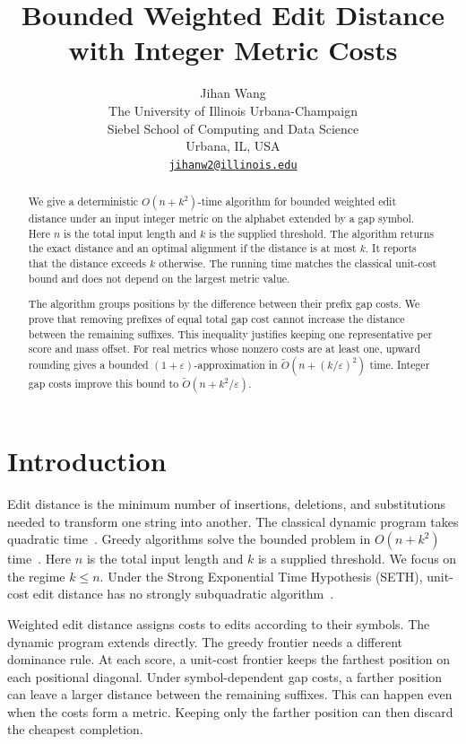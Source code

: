 \documentclass[11pt]{article}
\title{Bounded Weighted Edit Distance with Integer Metric Costs}
\author{Jihan Wang\\[0.3em]
    \small The University of Illinois Urbana-Champaign\\
    \small Siebel School of Computing and Data Science\\
    \small Urbana, IL, USA\\
    \small \href{mailto:jihanw2@illinois.edu}{\nolinkurl{jihanw2@illinois.edu}}}
\date{}
\theoremstyle{remark}
\newcommand{\eps}{\varepsilon}
\newcommand{\softO}{\widetilde O}
\begin{document}
\maketitle

\begin{abstract}
\normalsize
We give a deterministic $O(n+k^2)$-time algorithm for bounded weighted
edit distance under an input integer metric on the alphabet extended
by a gap symbol. Here $n$ is the total input length and
$k$ is the supplied threshold. The algorithm returns the exact
distance and an optimal alignment if the distance is at most $k$. It reports that the
distance exceeds $k$ otherwise. The running time matches the classical
unit-cost bound and does not depend on the largest metric value.

The algorithm groups positions by the difference between their prefix
gap costs. We prove that removing prefixes of equal total gap cost
cannot increase the distance between the remaining suffixes. This
inequality justifies keeping one representative per score and mass
offset. For real metrics whose nonzero costs are at least one, upward
rounding gives a bounded $(1+\eps)$-approximation in
$\softO(n+(k/\eps)^2)$ time. Integer gap costs
improve this bound to $\softO(n+k^2/\eps)$.
\end{abstract}

\section{Introduction}\label{sec:introduction}

Edit distance is the minimum number of insertions, deletions, and
substitutions needed to transform one string into another. The classical
dynamic program takes quadratic time~\cite{WF74}. Greedy algorithms solve
the bounded problem in $O(n+k^2)$ time~\cite{Ukk85,Mye86,LV88}.
Here $n$ is the total input length and $k$ is a supplied threshold.
We focus on the regime $k\le n$.
Under the Strong Exponential Time Hypothesis (SETH), unit-cost edit
distance has no strongly subquadratic algorithm~\cite{BI18,BK15}.

Weighted edit distance assigns costs to edits according to their symbols.
The dynamic program extends directly. The greedy frontier needs a
different dominance rule.
At each score, a unit-cost frontier keeps the farthest position on each
positional diagonal. Under symbol-dependent gap costs, a farther position
can leave a larger distance between the remaining suffixes. This can
happen even when the costs form a metric. Keeping only the farther
position can then discard the cheapest completion.
\end{document}
